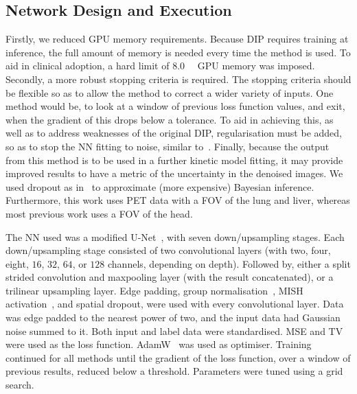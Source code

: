         \subsection{Network Design and Execution} \label{sec:pseudo_bayesian_dip_denoising_as_a_preprocessing_step_for_kinetic_modelling_in_dynamic_pet_appendix_methods_network_design_and_execution}
            Firstly, we reduced \gls{GPU} memory requirements. Because \gls{DIP} requires training at inference, the full amount of memory is needed every time the method is used. To aid in clinical adoption, a hard limit of \SI{8.0}{\giga\byte} \gls{GPU} memory was imposed. Secondly, a more robust stopping criteria is required. The stopping criteria should be flexible so as to allow the method to correct a wider variety of inputs.  One method would be, to look at a window of previous loss function values, and exit, when the gradient of this drops below a tolerance. To aid in achieving this, as well as to address weaknesses of the original \gls{DIP}, regularisation must be added, so as to stop the \gls{NN} fitting to noise, similar to~\parencite{Liu2019ImagePrior}. Finally, because the output from this method is to be used in a further kinetic model fitting, it may provide improved results to have a metric of the uncertainty in the denoised images. We used dropout as in~\parencite{Gal2016DropoutLearning} to approximate (more expensive) Bayesian inference. Furthermore, this work uses \gls{PET} data with a \gls{FOV} of the lung and liver, whereas most previous work uses a \gls{FOV} of the head.
        
            The \gls{NN} used was a modified U-Net~\parencite{Weng2021INet:Segmentation}, with seven down/upsampling stages. Each down/upsampling stage consisted of two convolutional layers (with two, four, eight, $16$, $32$, $64$, or $128$ channels, depending on depth). Followed by, either a split strided convolution and maxpooling layer (with the result concatenated), or a trilinear upsampling layer. Edge padding, group normalisation~\parencite{Wu2020GroupNormalization}, MISH activation~\parencite{Misra2019Mish:Function}, and spatial dropout, were used with every convolutional layer. Data was edge padded to the nearest power of two, and the input data had Gaussian noise summed to it. Both input and label data were standardised. \gls{MSE} and \gls{TV} were used as the loss function. AdamW~\parencite{Loshchilov2019DecoupledRegularization} was used as optimiser. Training continued for all methods until the gradient of the loss function, over a window of previous results, reduced below a threshold. Parameters were tuned using a grid search.
            
